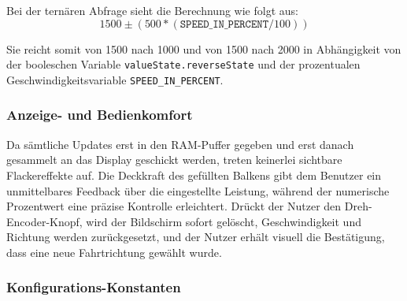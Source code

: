 \documentclass[a4paper,12pt]{article}
\begin{document}
Bei der ternären Abfrage sieht die Berechnung wie folgt aus:
\begin{equation}
    1500 \pm (500*(\texttt{SPEED\_IN\_PERCENT}/100))
\end{equation}

Sie reicht somit von 1500 nach 1000 und von 1500 nach 2000 in Abhängigkeit von der booleschen Variable \texttt{valueState.reverseState} und der prozentualen Geschwindigkeitsvariable \texttt{SPEED\_IN\_PERCENT}.


\subsubsection{Anzeige- und Bedienkomfort}
\label{sec:Anzeige- und Bedienkomfort}

Da sämtliche Updates erst in den RAM-Puffer gegeben und erst danach gesammelt an das Display geschickt werden, treten keinerlei sichtbare Flackereffekte auf. Die Deckkraft des gefüllten Balkens gibt dem Benutzer ein unmittelbares Feedback über die eingestellte Leistung, während der numerische Prozentwert eine präzise Kontrolle erleichtert. Drückt der Nutzer den Dreh-Encoder-Knopf, wird der Bildschirm sofort gelöscht, Geschwindigkeit und Richtung werden zurückgesetzt, und der Nutzer erhält visuell die Bestätigung, dass eine neue Fahrtrichtung gewählt wurde.

\subsubsection{Konfigurations-Konstanten}
\label{sec:Konfigurations-Konstanten}
\end{document}
